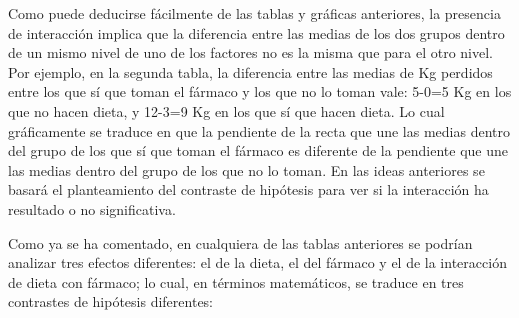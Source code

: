 Como puede deducirse fácilmente de las tablas y gráficas anteriores, la presencia de interacción implica que la
diferencia entre las medias de los dos grupos dentro de un mismo nivel de uno de los factores no es la misma que para el
otro nivel. Por ejemplo, en la segunda tabla, la diferencia entre las medias de Kg perdidos entre los que sí que toman
el fármaco y los que no lo toman vale: 5-0=5 Kg en los que no hacen dieta, y 12-3=9 Kg en los que sí que hacen dieta. Lo
cual gráficamente se traduce en que la pendiente de la recta que une las medias dentro del grupo de los que sí que toman
el fármaco es diferente de la pendiente que une las medias dentro del grupo de los que no lo toman. En las ideas
anteriores se basará el planteamiento del contraste de hipótesis para ver si la interacción ha resultado o no
significativa.

Como ya se ha comentado, en cualquiera de las tablas anteriores se podrían analizar tres efectos diferentes: el de la
dieta, el del fármaco y el de la interacción de dieta con fármaco; lo cual, en términos matemáticos, se traduce en tres
contrastes de hipótesis diferentes:

